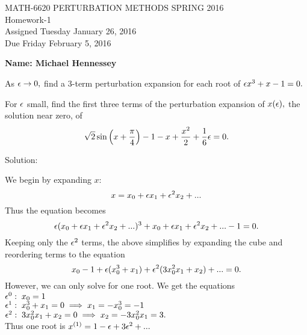 
\pagestyle{empty}


\begin{center}
\large{ MATH-6620 \hspace{1in}  PERTURBATION METHODS \hspace{1in}SPRING 2016\\ Homework-1 \\ Assigned Tuesday January 26, 2016 \\ Due Friday February 5, 2016}\end{center}

\vspace{6 ex}

{\bf Name: Michael Hennessey} \hfill

\vspace{6 ex}


 \ec

\benum

\item
\benum
 \item As $\epsilon \to 0,$ find a 3-term perturbation expansion for each root of $\epsilon x^3+x-1=0.$
 \item For $\epsilon$ small, find the first three terms of the perturbation expansion of $x(\epsilon),$ the solution near zero, of
\begin{equation*}
\sqrt 2 \sin \left(x+\frac{\pi}{4}\right) -1 -x + \frac{x^2}{2} + \frac{1}{6}\epsilon = 0.
\end{equation*}
\eenum

        Solution:\\

        \benum
            \item We begin by expanding $x$:
            $$x=x_0+\epsilon x_1+\epsilon^2 x_2+...$$
            Thus the equation becomes
            $$\epsilon(x_0+\epsilon x_1+\epsilon^2 x_2+...)^3+x_0+\epsilon x_1+\epsilon^2 x_2+...-1=0.$$
            Keeping only the $\epsilon^2$ terms, the above simplifies by expanding the cube and reordering terms to the equation
            $$x_0-1+\epsilon(x_0^3+x_1)+\epsilon^2(3x_0^2x_1+x_2)+...=0.$$
            However, we can only solve for one root. We get the equations\\
            $\epsilon^0: \; x_0=1$ \\
            $\epsilon^1: \; x_0^3+x_1=0\implies x_1=-x_0^3=-1$\\
            $\epsilon^2: \; 3x_0^2 x_1+x_2=0\implies x_2=-3x_0^2 x_1=3.$\\
            Thus one root is $x^{(1)}=1-\epsilon+3\epsilon^2+...$\\

